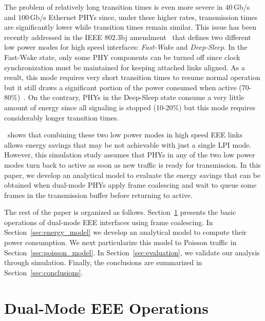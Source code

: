 \documentclass[journal,10pt,letterpaper]{IEEEtran}
\begin{document}
The problem of relatively long transition times is even more severe in
$40\,$Gb/s and $100\,$Gb/s Ethernet PHYs since, under these higher
rates, transmission times are significantly lower while transition
times remain similar. This issue has been recently addressed in the
IEEE 802.3bj amendment~\cite{802.3bj} that defines two different low
power modes for high speed interfaces: \emph{Fast-Wake} and
\emph{Deep-Sleep}. In the Fast-Wake state, only some PHY components
can be turned off since clock synchronization must be maintained for
keeping attached links aligned. As a result, this mode requires very
short transition times to resume normal operation but it still draws a
significant portion of the power consumed when active
(70-80\%)~\cite{barrass12:_options_100g}. On the contrary, PHYs in the
Deep-Sleep state consume a very little amount of energy since all
signaling is stopped (10-20\%) but this mode requires considerably
longer transition times.

\cite{mostowfi15:dual_mode_eee}~shows that combining these two low
power modes in high speed EEE links allows energy savings that may be
not achievable with just a single LPI mode. However, this simulation
study assumes that PHYs in any of the two low power modes turn back to
active as soon as new traffic is ready for transmission. In this
paper, we develop an analytical model to evaluate the energy savings
that can be obtained when dual-mode PHYs apply frame coalescing and
wait to queue some frames in the transmission buffer before returning
to active.

The rest of the paper is organized as
follows. Section~\ref{sec:coalescing} presents the basic operations of
dual-mode EEE interfaces using frame coalescing. In
Section~\ref{sec:energy_model} we develop an analytical model to
compute their power consumption. We next particularize this model to
Poisson traffic in Section~\ref{sec:poisson_model}. In
Section~\ref{sec:evaluation}, we validate our analysis through
simulation. Finally, the conclusions are summarized in
Section~\ref{sec:conclusions}.

\section{Dual-Mode EEE Operations}
\label{sec:coalescing}
\end{document}
